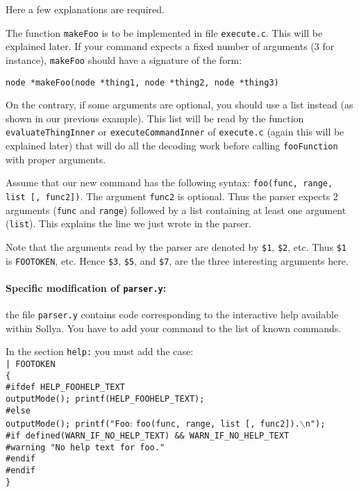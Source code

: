 \documentclass{article}
\newcommand{\commandName}{\texttt{foo}\xspace}
\newcommand{\commandNameUp}{\texttt{Foo}\xspace} %
\newcommand{\commandFunction}{\texttt{fooFunction}\xspace}
\newcommand{\commandToken}{\texttt{FOOTOKEN}\xspace}
\newcommand{\commandMakeFunc}{\texttt{makeFoo}}
\newcommand{\commandHELP}{\texttt{FOOHELP}\xspace} %
\begin{document}
Here a few explanations are required.

The function \commandMakeFunc{} is to be implemented in file \texttt{execute.c}. This will be explained later. If your command expects a fixed number of arguments ($3$ for instance), \commandMakeFunc{} should have a signature of the form:
\begin{center}
  \texttt{node *}\commandMakeFunc\texttt{(node *thing1, node *thing2, node *thing3)}
\end{center}
On the contrary, if some arguments are optional, you should use a list instead (as shown in our previous example). This list will be read by the function \texttt{evaluateThingInner} or \texttt{executeCommandInner} of \texttt{execute.c} (again this will be explained later) that will do all the decoding work before calling \commandFunction with proper arguments.

Assume that our new command has the following syntax: \commandName\texttt{(func, range, list [, func2])}. The argument \texttt{func2} is optional. Thus the parser expects $2$ arguments (\texttt{func} and \texttt{range}) followed by a list containing at least one argument (\texttt{list}). This explains the line we just wrote in the parser.

Note that the arguments read by the parser are denoted by \texttt{\$1}, \texttt{\$2}, etc. Thus \texttt{\$1} is \commandToken, etc. Hence \texttt{\$3}, \texttt{\$5}, and \texttt{\$7}, are the three interesting arguments here.


\paragraph{Specific modification of \texttt{parser.y}: } the file \texttt{parser.y} contains code corresponding to the interactive help available within Sollya. You have to add your command to the list of known commands.

In the section \texttt{help:} you must add the case:\\
    \texttt{| }\commandToken\\
    \phantom{1}\quad\texttt{\{}\\
    \texttt{\#ifdef HELP\_}\commandHELP\texttt{\_TEXT}\\
    \phantom{1}\quad\texttt{outputMode(); printf(HELP\_}\commandHELP\texttt{\_TEXT);}\\
    \texttt{\#else}\\
    \phantom{1}\quad\texttt{outputMode(); printf("}\commandNameUp: \commandName\texttt{(func, range, list [, func2]).$\backslash$n");}\\
     \phantom{1}\quad\texttt{\#if defined(WARN\_IF\_NO\_HELP\_TEXT) \&\& WARN\_IF\_NO\_HELP\_TEXT}\\
     \phantom{1}\quad\phantom{1}\texttt{\#warning "No help text for \commandName."}\\
     \phantom{1}\quad\texttt{\#endif}\\
    \texttt{\#endif}\\
    \phantom{1}\quad\texttt{\}}
\end{document}
